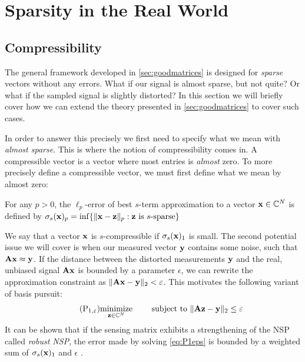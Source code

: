 






\section{Sparsity in the Real World}
\subsection{Compressibility}
The general framework developed in \cref{sec:goodmatrices} is designed for \textit{sparse} vectors without any errors. What if our signal is almost sparse, but not quite? Or what if the sampled signal is slightly distorted? In this section we will briefly cover how we can extend the theory presented in \cref{sec:goodmatrices} to cover such cases.

In order to answer this precisely we first need to specify what we mean with \textit{almost sparse}. This is where the notion of compressibility comes in. A compressible vector is a vector where most entries is \textit{almost} zero. To more precisely define a compressible vector, we must first define what we mean by almost zero:
\begin{definition} \label{def:compressibility}
	For any $ p > 0 $, the $ \ell_{p} $-error of best $ s $-term approximation to a vector $ \mathbf{x} \in \mathbb{C}^{N} $ is defined by
	\(
		\sigma_{s}(\mathbf{x})_{p} = \inf \{\lVert\mathbf{x} - \mathbf{z}\rVert_{p} : \mathbf{z} \text{ is } s\text{-sparse}\}
	\)
\end{definition}

We say that a vector $ \mathbf{x} $ is $ s $-compressible if $ \sigma_{s}(\mathbf{x})_{1} $ is small. The second potential issue we will cover is when our measured vector $ \mathbf{y} $ contains some noise, such that $ \mathbf{A}\mathbf{x} \approx \mathbf{y} $. If the distance between the distorted measurements $ \mathbf{y} $ and the real, unbiased signal $ \mathbf{A}\mathbf{x} $ is bounded by a parameter $ \epsilon $, we can rewrite the approximation constraint as $ \lVert\mathbf{A}\mathbf{x} - \mathbf{y}\rVert_{2} < \varepsilon $. This motivates the following variant of basis pursuit:
\begin{equation}
	\tag{P$_{1, \epsilon}$}
	\label{eq:P1eps}
	\minimize{\z\in\Cx^{N}} \quad\subjectto \norm{\A\z - \y}_{2} \leq \epsilon
\end{equation}
It can be shown that if the sensing matrix exhibits a strengthening of the NSP called \textit{robust NSP}, the error made by solving \eqref{eq:P1eps} is bounded by a weighted sum of $ \sigma_{s}(\mathbf{x})_{1} $ and $ \epsilon $ \cite[Section~4.3]{foucart13intro}.




